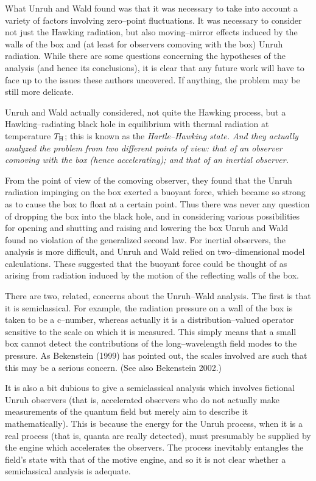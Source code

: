 What Unruh and Wald found was that it was necessary to take into account a
variety of factors involving zero--point fluctuations. It was necessary to
consider not just the Hawking radiation, but also moving--mirror effects
induced by the walls of the box and (at least for observers comoving with the
box) Unruh radiation.  While there are some questions concerning the hypotheses
of the analysis (and hence its conclusions), it is clear that any future work
will have to face up to the issues these authors uncovered.  If
anything, the problem may be still more delicate.

Unruh and Wald actually considered, not quite the Hawking process, but a
Hawking--radiating black hole in equilibrium with thermal radiation at
temperature $T_{\rm H}$; this is known as the \it Hartle--Hawking \rm state. 
And they actually analyzed the problem from two different points of view:  that
of an observer comoving with the box (hence accelerating); and that of an
inertial observer.  

From the point of view of the comoving observer, they found that the Unruh
radiation impinging on the box exerted a buoyant force, which became so strong
as to cause the box to float at a certain point. Thus there was never any
question of dropping the box into the black hole, and in considering various
possibilities for opening and shutting and raising and lowering the box Unruh
and Wald found no violation of the generalized second law.  For inertial
observers, the analysis is more difficult, and Unruh and Wald relied on
two--dimensional model calculations.  These suggested that the buoyant force
could be thought of as arising from radiation induced by the motion of the
reflecting walls of the box.  

There are two, related, concerns about the Unruh--Wald analysis.  The first is
that it is semiclassical.  For example, the  radiation pressure on a wall of
the box is taken to be a c--number, whereas actually it is a
distribution--valued operator sensitive to the scale on which it  is measured. 
This simply means that a small box cannot detect the contributions of the
long--wavelength field modes to the pressure. As Bekenstein (1999) has pointed
out, the scales involved are such that this may be a serious concern.
(See also Bekenstein 2002.)

It is also a bit dubious to give a semiclassical analysis which involves
fictional Unruh observers (that is, accelerated observers who do not actually
make measurements of the quantum field but merely aim to describe it
mathematically).  This is because the energy for the Unruh process, when it is
a real process (that is, quanta are really detected), must presumably be
supplied by the engine which accelerates the observers.  The process inevitably
entangles the field's state with that of the motive engine, and so it is not
clear whether a semiclassical analysis is adequate.

